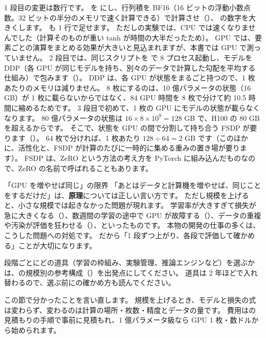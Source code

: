 1 段目の変更は数行です。
 を  にし、行列積を BF16（16 ビットの浮動小数点数。32 ビットの半分のメモリで速く計算できる）で計算させ（）、 の数字を大きくします。
 も 1 行で足せます。
ただしの実験では、CPU では速くなりませんでした（計算そのものが重い tanh が時間の大半だったため）。
GPU では、要素ごとの演算をまとめる効果が大きいと見込まれますが、本書では GPU で測っていません。
2 段目では、同じスクリプトを  で 8 プロセス起動し、モデルを DDP（各 GPU が同じモデルを持ち、別々のデータで計算した勾配を平均する仕組み）で包みます（）。
DDP は、各 GPU が状態をまるごと持つので、1 枚あたりのメモリは減りません。
8 枚にするのは、10 億パラメータの状態（16 GB）が 1 枚に載らないからではなく、84 GPU 時間を 8 枚で分けて約 10.5 時間に縮めるためです。
3 段目で初めて、1 枚の GPU にモデルの状態が載らなくなります。
80 億パラメータの状態は $16 \times 8\times10^{9} = 128$ GB で、H100 の 80 GB を超えるからです。
そこで、状態を GPU の間で分割して持ち合う FSDP が要ります（）。
64 枚で分ければ、1 枚あたり $128\div64=2$ GB です（このほかに、活性化と、FSDP が計算のたびに一時的に集める重みの置き場が要ります）。
FSDP は、ZeRO という方法の考え方を PyTorch に組み込んだものなので、ZeRO の名前で呼ばれることもあります。

\begin{caution}{「GPU を増やせば同じ」の限界}
「あとはデータと計算機を増やせば、同じことをするだけだ」は、\textbf{原理}については正しい言い方です。
ただし規模を上げると、小さな規模では起きなかった問題が現れます。
学習率が大きすぎて損失が急に大きくなる（）、数週間の学習の途中で GPU が故障する（）、データの重複や汚染が評価を狂わせる（）、といったものです。
本物の開発の仕事の多くは、こうした問題への対処です。
だから「1 段ずつ上がり、各段で評価して確かめる」ことが大切になります。
\end{caution}

段階ごとにどの道具（学習の枠組み、実験管理、推論エンジンなど）を選ぶかは、の規模別の参考構成（）を出発点にしてください。
道具は 2 年ほどで入れ替わるので、選ぶ前にの確かめ方も読んでください。

この節で分かったことを言い直します。
規模を上げるとき、モデルと損失の式は変わらず、変わるのは計算の場所・枚数・精度とデータの量です。
費用はの見積もりの手順で事前に見積もれ、1 億パラメータ級なら GPU 1 枚・数ドルから始められます。


